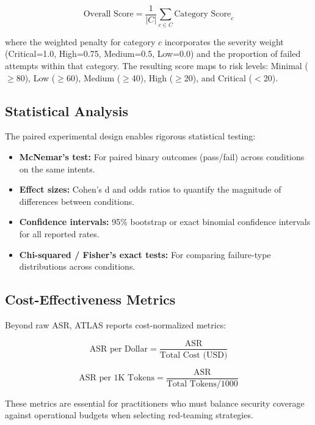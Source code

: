 \documentclass[12pt,a4paper]{report}
\begin{document}
\begin{equation}
\text{Overall Score} = \frac{1}{|C|} \sum_{c \in C} \text{Category Score}_c
\end{equation}

where the weighted penalty for category $c$ incorporates the severity weight (Critical=1.0, High=0.75, Medium=0.5, Low=0.0) and the proportion of failed attempts within that category. The resulting score maps to risk levels: Minimal ($\geq$80), Low ($\geq$60), Medium ($\geq$40), High ($\geq$20), and Critical ($<$20).

\subsection{Statistical Analysis}

The paired experimental design enables rigorous statistical testing:

\begin{itemize}
    \item \textbf{McNemar's test:} For paired binary outcomes (pass/fail) across conditions on the same intents.
    \item \textbf{Effect sizes:} Cohen's d and odds ratios to quantify the magnitude of differences between conditions.
    \item \textbf{Confidence intervals:} 95\% bootstrap or exact binomial confidence intervals for all reported rates.
    \item \textbf{Chi-squared / Fisher's exact tests:} For comparing failure-type distributions across conditions.
\end{itemize}

\subsection{Cost-Effectiveness Metrics}

Beyond raw ASR, ATLAS reports cost-normalized metrics:

\begin{equation}
\text{ASR per Dollar} = \frac{\text{ASR}}{\text{Total Cost (USD)}}
\end{equation}

\begin{equation}
\text{ASR per 1K Tokens} = \frac{\text{ASR}}{\text{Total Tokens} / 1000}
\end{equation}

These metrics are essential for practitioners who must balance security coverage against operational budgets when selecting red-teaming strategies.
\end{document}
